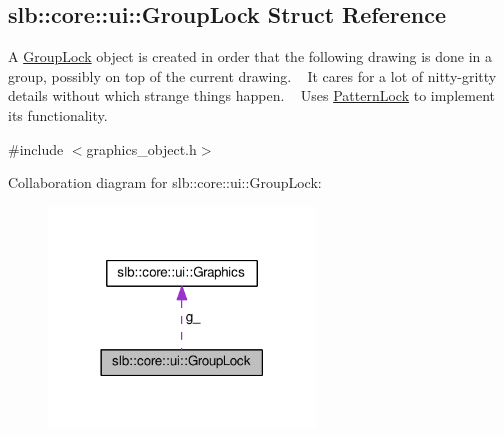 \hypertarget{structslb_1_1core_1_1ui_1_1GroupLock}{}\subsection{slb\+:\+:core\+:\+:ui\+:\+:Group\+Lock Struct Reference}
\label{structslb_1_1core_1_1ui_1_1GroupLock}


A \hyperlink{structslb_1_1core_1_1ui_1_1GroupLock}{Group\+Lock} object is created in order that the following drawing is done in a group, possibly on top of the current drawing. ~\newline
It cares for a lot of nitty-\/gritty details without which strange things happen. ~\newline
Uses \hyperlink{structslb_1_1core_1_1ui_1_1PatternLock}{Pattern\+Lock} to implement its functionality.  




{\ttfamily \#include $<$graphics\+\_\+object.\+h$>$}



Collaboration diagram for slb\+:\+:core\+:\+:ui\+:\+:Group\+Lock\+:\nopagebreak
\begin{figure}[H]
\begin{center}
\leavevmode
\includegraphics[width=201pt]{structslb_1_1core_1_1ui_1_1GroupLock__coll__graph}
\end{center}
\end{figure}

